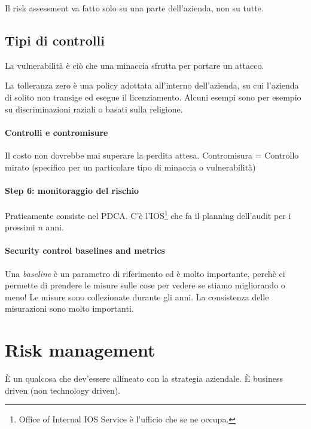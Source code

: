 Il risk assessment va fatto solo su una parte dell'azienda, non su tutte.



\subsection{Tipi di controlli}


La vulnerabilità è ciò che una minaccia sfrutta per portare un attacco.


La tolleranza zero è una policy adottata all'interno dell'azienda, su cui 
l'azienda di solito non transige ed esegue il licenziamento. Alcuni esempi sono 
per esempio su discriminazioni raziali o basati sulla religione. 


\paragraph*{Controlli e contromisure}

Il costo non dovrebbe mai superare la perdita attesa.
Contromisura = Controllo mirato (specifico per un particolare tipo di minaccia o 
vulnerabilità)

\paragraph*{Step 6: monitoraggio del rischio}

Praticamente consiste nel PDCA.
C'è l'IOS\footnote{Office of Internal IOS Service è l'ufficio che se ne occupa.} 
che fa il planning dell'audit per i prossimi $n$ anni.




\paragraph*{Security control baselines and metrics}

Una \textit{baseline} è un parametro di riferimento ed è molto importante, 
perchè ci permette di prendere le misure sulle cose per vedere se stiamo 
migliorando o meno!
Le misure sono collezionate durante gli anni. La consistenza delle misurazioni 
sono molto importanti.

\section{Risk management}
È un qualcosa che dev'essere allineato con la strategia aziendale.
È business driven (non technology driven).


